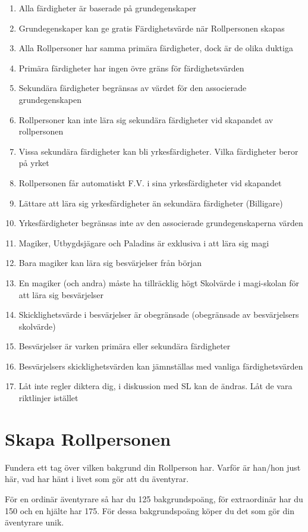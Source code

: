 \documentclass[a4paper, 10pt, titlepage]{article}
\begin{document}
\begin{enumerate}[I]
\item Alla färdigheter är baserade på grundegenskaper
\item Grundegenskaper kan ge gratis Färdighetsvärde när Rollpersonen skapas
\item Alla Rollpersoner har samma primära färdigheter, dock är de olika duktiga
\item Primära färdigheter har ingen övre gräns för färdighetsvärden
\item Sekundära färdigheter begränsas av värdet för den associerade grundegenskapen
\item Rollpersoner kan inte lära sig sekundära färdigheter vid skapandet av rollpersonen
\item Vissa sekundära färdigheter kan bli yrkesfärdigheter. Vilka färdigheter beror på yrket
\item Rollpersonen får automatiskt F.V. i sina yrkesfärdigheter vid skapandet
\item Lättare att lära sig yrkesfärdigheter än sekundära färdigheter (Billigare)
\item Yrkesfärdigheter begränsas inte av den associerade grundegenskaperna värden
\item Magiker, Utbygdsjägare och Paladins är exklusiva i att lära sig magi
\item Bara magiker kan lära sig besvärjelser från början
\item En magiker (och andra) måste ha tillräcklig högt Skolvärde i magi-skolan för att lära sig besvärjelser
\item Skicklighetsvärde i besvärjelser är obegränsade (obegränsade av besvärjelsers skolvärde)
\item Besvärjelser är varken primära eller sekundära färdigheter
\item Besvärjelsers skicklighetsvärden kan jämnställas med vanliga färdighetsvärden
\item Låt inte regler diktera dig, i diskussion med SL kan de ändras. Låt de vara riktlinjer istället
\end{enumerate}

\section{Skapa Rollpersonen}
Fundera ett tag över vilken bakgrund din Rollperson har. Varför är han/hon just här, vad har hänt i livet som
gör att du äventyrar.

För en ordinär äventyrare så har du 125 bakgrundspoäng, för extraordinär har du 150 och en hjälte har 175.
För dessa bakgrundspoäng köper du det som gör din äventyrare unik.
\end{document}
